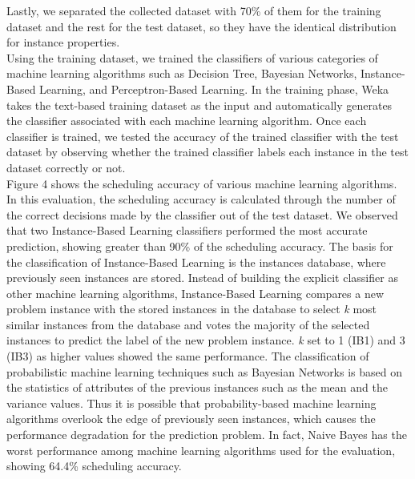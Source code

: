 \documentclass[10pt, conference, compsocconf]{IEEEtran}
\begin{document}
%
Lastly, we separated the collected dataset with 70\% of them for
the training dataset and the rest for the test dataset, so they have
the identical distribution for instance properties.\\
%
\indent Using the training dataset, 
we trained the classifiers of various categories of machine learning 
algorithms such as Decision Tree, Bayesian Networks, Instance-Based
Learning, and Perceptron-Based Learning.
%
In the training phase, Weka takes the text-based training dataset as
the input and automatically generates the classifier associated with
each machine learning algorithm.
%
Once each classifier is trained, we tested the accuracy of the
trained classifier with the test dataset by observing whether the trained classifier labels each
instance in the test dataset correctly or not.\\
%
\indent Figure 4 shows the scheduling accuracy of various machine learning
algorithms.
%
In this evaluation, the scheduling accuracy is calculated through the
number of the correct decisions made by the classifier out of the test
dataset.
%
We observed that two Instance-Based Learning classifiers performed 
the most accurate prediction, showing greater than 90\% of the scheduling
accuracy.
%
%
The basis for the classification of Instance-Based Learning is the instances 
database, where previously seen instances are stored.
%
Instead of building the explicit classifier as other machine learning
algorithms, Instance-Based Learning compares a new problem instance with the stored
instances in the database to select \textit{k} most similar instances 
from the database and votes the majority of the selected instances to 
predict the label of the new problem instance.
%
\textit{k} set to 1 (IB1) and 3 (IB3) as higher values showed the same
performance. 
%
%
The classification of probabilistic machine learning
techniques such as Bayesian Networks is based on the statistics
of attributes of the previous instances such as the mean and the
variance values.
%
Thus it is possible that probability-based machine learning
algorithms overlook the edge of previously seen instances, which causes
the performance degradation for the prediction problem. 
%
In fact, Naive Bayes has the worst performance among machine learning
algorithms used for the evaluation, showing 64.4\% scheduling
accuracy.
%
\end{document}
